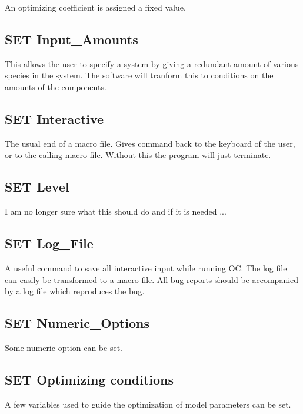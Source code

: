\documentclass[12pt]{article}
\begin{document}
An optimizing coefficient is assigned a fixed value.

\subsection{SET Input\_Amounts}

This allows the user to specify a system by giving a redundant amount
of various species in the system.  The software will tranform this to
conditions on the amounts of the components.

\subsection{SET Interactive}

The usual end of a macro file.  Gives command back to the keyboard of
the user, or to the calling macro file.  Without this the program will
just terminate.

\subsection{SET Level}

I am no longer sure what this should do and if it is needed ...

\subsection{SET Log\_File}

A useful command to save all interactive input while running OC.  The
log file can easily be transformed to a macro file.  All bug reports
should be accompanied by a log file which reproduces the bug.

\subsection{SET Numeric\_Options}

Some numeric option can be set.

\subsection{SET Optimizing conditions}

A few variables used to guide the optimization of model parameters can
be set.
\end{document}
